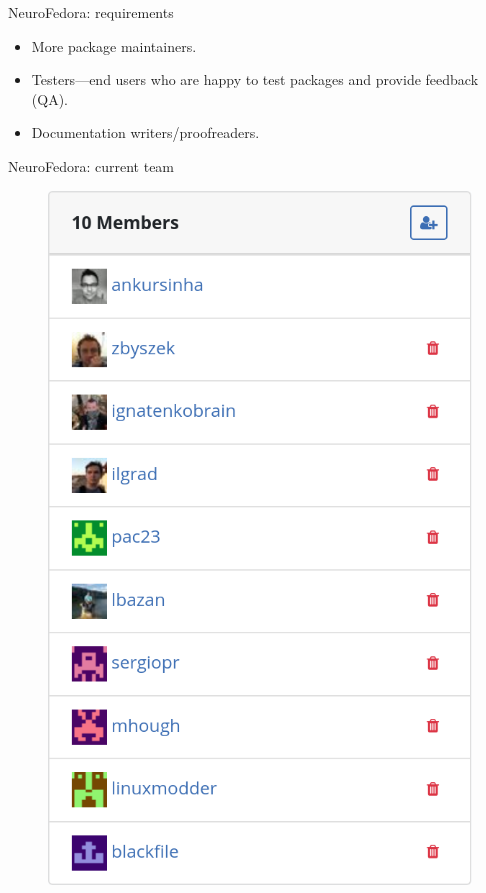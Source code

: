 \begin{frame}[c]{NeuroFedora: requirements}
  \begin{itemize}
    \item More package maintainers\footnotemark.
      \pause{}
    \item Testers---end users who are happy to test packages and provide feedback (QA)\footnotemark.
      \pause{}
    \item Documentation writers/proofreaders.
  \end{itemize}
\end{frame}
\begin{frame}[c]{NeuroFedora: current team}
  \begin{figure}[h]
    \centering
    \includegraphics[keepaspectratio,height=0.8\textheight]{images/neurofedora-team.png}
  \end{figure}
\end{frame}
